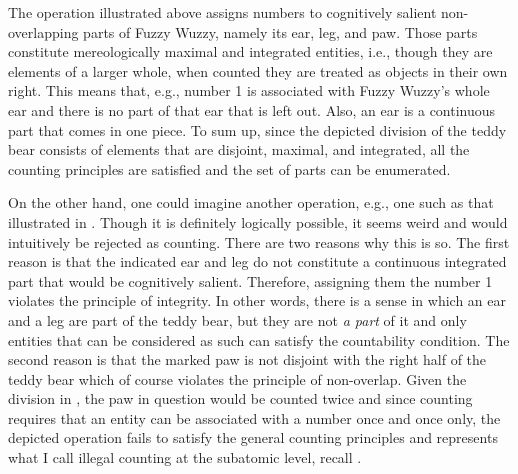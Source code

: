 The operation illustrated above assigns numbers to cognitively salient non-overlapping parts of Fuzzy Wuzzy, namely its ear, leg, and paw. Those parts constitute mereologically maximal and integrated entities, i.e., though they are elements of a larger whole, when counted they are treated as objects in their own right. This means that, e.g., number 1 is associated with Fuzzy Wuzzy's whole ear and there is no part of that ear that is left out. Also, an ear is a continuous part that comes in one piece. To sum up, since the depicted division of the teddy bear consists of elements that are disjoint, maximal, and integrated, all the counting principles are satisfied and the set of parts can be enumerated.

On the other hand, one could imagine another operation, e.g., one such as that illustrated in . Though it is definitely logically possible, it seems weird and would intuitively be rejected as counting. There are two reasons why this is so. The first reason is that the indicated ear and leg do not constitute a continuous integrated part that would be cognitively salient. Therefore, assigning them the number 1 violates the principle of integrity. In other words, there is a sense in which an ear and a leg are part of the teddy bear, but they are not \textit{a part} of it and only entities that can be considered as such can satisfy the countability condition. The second reason is that the marked paw is not disjoint with the right half of the teddy bear which of course violates the principle of non-overlap. Given the division in , the paw in question would be counted twice and since counting requires that an entity can be associated with a number once and once only, the depicted operation fails to satisfy the general counting principles and represents what I call illegal counting at the subatomic level, recall .

